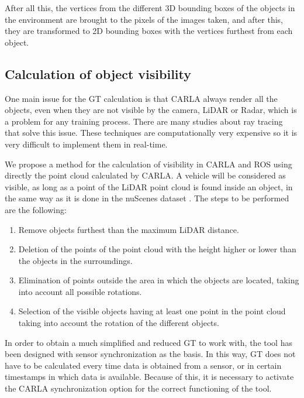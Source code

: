 After all this, the vertices from the different 3D bounding boxes of the objects in the environment are brought to the pixels of the images taken, and after this, they are transformed to 2D bounding boxes with the vertices furthest from each object.
	
\subsection{Calculation of object visibility}
	One main issue for the GT calculation is that CARLA always render all the objects, even when they are not visible by the camera, LiDAR or Radar, which is a problem for any training process.
	There are many studies about ray tracing that solve this issue. These techniques \cite{raytracing1} \cite{raytracing2} are computationally very expensive so it is very difficult to implement them in real-time.\par
	We propose a method for the calculation of visibility in CARLA and ROS using directly the point cloud calculated by CARLA. A vehicle will be considered as visible, as long as a point of the LiDAR point cloud is found inside an object, in the same way as it is done in the nuScenes dataset \cite{caesar2020nuscenes}. The steps to be performed are the following:
	\begin{enumerate}
		\item Remove objects furthest than the maximum LiDAR distance.
		\item Deletion of the points of the point cloud with the height higher or lower than the objects in the surroundings.
		\item Elimination of points outside the area in which the objects are located, taking into account all possible rotations.
		\item Selection of the visible objects having at least one point in the point cloud taking into account the rotation of the different objects.
	\end{enumerate}
	
	\par
	In order to obtain a much simplified and reduced GT to work with, the tool has been designed with sensor synchronization as the basis. In this way, GT does not have to be calculated every time data is obtained from a sensor, or in certain timestamps in which data is available. Because of this, it is necessary to activate the CARLA synchronization option for the correct functioning of the tool.\par
	
